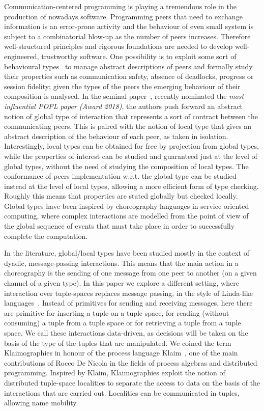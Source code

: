 
Communication-centered programming is playing a tremendous role in the production of nowadays software. Programming peers that need to exchange information is an error-prone activity and the behaviour of even small system is subject to a combinatorial blow-up as the number of peers increases.
Therefore well-structured principles and rigorous foundations are needed to develop well-engineered, trustworthy software. 
One possibility is to exploit some sort of behavioural types~\cite{} to manage abstract descriptions of peers and formally study their properties such as communication safety, absence of deadlocks, progress or session fidelity: given the types of the peers the emerging behaviour of their composition is analysed.
In the seminal paper~\cite{DBLP:conf/popl/HondaYC08}, recently nominated the \emph{most influential POPL paper (Award 2018)}, the authors push forward an abstract notion of global type of interaction that represents a sort of contract between the communicating peers. This is paired with the notion of local type that gives an abstract description of the behaviour of each peer, as taken in isolation.
Interestingly, local types can be obtained for free by projection from global types, while the properties of interest can be studied and guaranteed just at the level of global types, without the need of studying the composition of local types. The conformance of peers implementation w.r.t. the global type can be studied instead at the level of local types, allowing a more efficient form of type checking. Roughly this means that properties are stated globally but checked locally. Global types have been inspired by choreography languages in service oriented computing, where complex interactions are modelled from the point of view of the global sequence of events that must take place in order to successfully complete the computation.

In the literature, global/local types have been studied mostly in the context of dyadic, message-passing interactions. This means that the main action in a choreography is the sending of one message from one peer to another (on a given channel of a given type). In this paper we explore a different setting, where interaction over tuple-spaces replaces message passing, in the style of Linda-like languages~\cite{DBLP:journals/toplas/Gelernter85}.
Instead of primitives for sending and receiving messages, here there are primitive for inserting a tuple on a tuple space, for reading (without consuming) a tuple from a tuple space or for retrieving a tuple from a tuple space. We call these interactions data-driven, as decisions will be taken on the basis of the type of the tuples that are manipulated. We coined the term Klaimographies in honour of the process language Klaim~\cite{DBLP:journals/tse/NicolaFP98}, one of the main contributions of Rocco De Nicola in the fields of process algebras and distributed programming. Inspired by Klaim, Klaimographies exploit the notion of distributed tuple-space localities to separate the access to data on the basis of the interactions that are carried out. Localities can be communicated in tuples, allowing name mobility.

